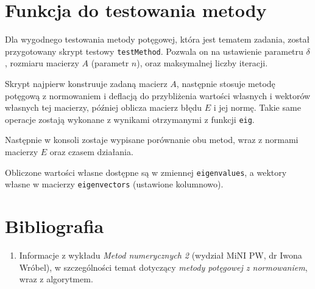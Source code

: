\documentclass[12pt]{article}
\begin{document}
	
	
	\section{Funkcja do testowania metody}
	Dla wygodnego testowania metody potęgowej, która jest tematem zadania, został przygotowany skrypt testowy \texttt{testMethod}. Pozwala on na ustawienie parametru $\delta$, rozmiaru macierzy $A$ (parametr $n$), oraz maksymalnej liczby iteracji.
	
	Skrypt najpierw konstruuje zadaną macierz $A$, następnie stosuje metodę potęgową z normowaniem i deflacją do przybliżenia wartości własnych i wektorów własnych tej macierzy, później oblicza macierz błędu $E$ i jej normę. Takie same operacje zostają wykonane z wynikami otrzymanymi z funkcji \texttt{eig}.
	
	Następnie w konsoli zostaje wypisane porównanie obu metod, wraz z normami macierzy $E$ oraz czasem działania.
	
	Obliczone wartości własne dostępne są w zmiennej \texttt{eigenvalues}, a wektory własne w macierzy \texttt{eigenvectors} (ustawione kolumnowo).
	
	
	
	\section{Bibliografia}
	\begin{enumerate}
		\item Informacje z wykładu \textit{Metod numerycznych 2} (wydział MiNI PW, dr Iwona Wróbel), w szczególności temat dotyczący \textit{metody potęgowej z normowaniem}, wraz z algorytmem.
	\end{enumerate}
	
\end{document}
